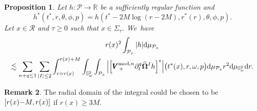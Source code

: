 \documentclass[JEP,XML,SOM,Unicode,published]{cedram}
\theoremstyle{plain}
\newtheorem{proposition}{Proposition}[section]
\theoremstyle{definition}
\newtheorem{remark}[proposition]{Remark}
\newcommand\R{{\mathbb{R}}}
\newcommand\dr{{\mathrm{d}}}
\begin{document}
\begin{proposition}\label{ProdecaypointBoundedregion}
Let $h : \mathcal{P} \to \R$ be a sufficiently regular function and
\[
h^*(t^*,r,\theta,\phi,p)=h(t^*-2M\log(r-2M),r^*(r),\theta,\phi,p).
\]
Let $x \in \mathcal{R} $ and $\tau \geq 0$ such that $x \in \Sigma_\tau$. We~have
\begin{multline*}
r(x)^2 \int_{\mathcal{P}_x} |h| \dr \mu_{\mathcal{P}_x} \\
\lesssim \sum_{n+q \leq 1} \sum_{|I| \leq 2} \int_{r= r(x)}^{ r(x)+M } \int_{\mathbb{S}^2_\omega} \int_{\mathcal{P}_x} \Big| \Bigl[ \pmb{V}_{\, +}^{ \mathrm{mod},n} \partial_t^q \widehat{\mathbf{\Omega}}^I h \Bigr]^* \Big| \bigl(t^*(x),r,\omega,p \bigr) \dr \mu_{\mathcal{P}_x} r^2 \dr \mu_{\mathbb{S}^2_\omega} \dr r.
\end{multline*}
\end{proposition}
\begin{remark}\label{Rkdomain}
The radial domain of the integral could be chosen to be \hbox{$[r(x)\mkern-4mu-\mkern-4mu M,r(x)]$} if $r(x) \geq 3M$.
\end{remark}
\end{document}
